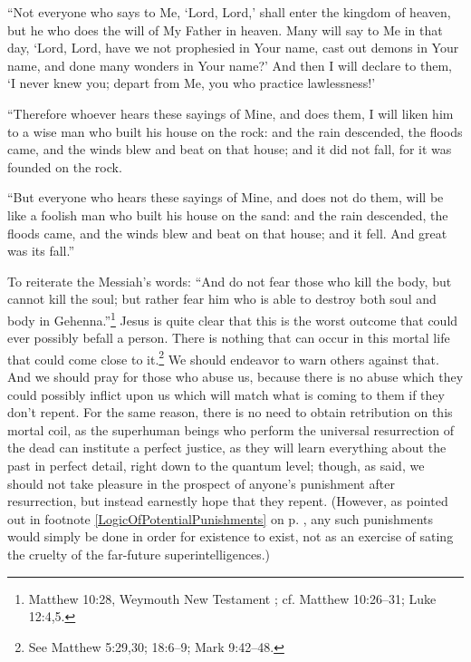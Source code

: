 \documentclass[letterpaper,12pt]{article}
\newenvironment{squotation}
  {\small\quotation}
  {\endquotation\normalsize}
\begin{document}
\begin{squotation}
``Not everyone who says to Me, `Lord, Lord,' shall enter the kingdom of heaven, but he who does the will of My Father in heaven. Many will say to Me in that day, `Lord, Lord, have we not prophesied in Your name, cast out demons in Your name, and done many wonders in Your name?' And then I will declare to them, `I never knew you; depart from Me, you who practice lawlessness!'

``Therefore whoever hears these sayings of Mine, and does them, I will liken him to a wise man who built his house on the rock: and the rain descended, the floods came, and the winds blew and beat on that house; and it did not fall, for it was founded on the rock.

``But everyone who hears these sayings of Mine, and does not do them, will be like a foolish man who built his house on the sand: and the rain descended, the floods came, and the winds blew and beat on that house; and it fell. And great was its fall.''
\end{squotation}

To reiterate the Messiah's words: ``And do not fear those who kill the body, but cannot kill the soul; but rather fear him who is able to destroy both soul and body in Gehenna.''\footnote{Matthew 10:28, Weymouth New Testament \cite{Weymouth1903}; cf. Matthew 10:26--31; Luke 12:4,5.} Jesus is quite clear that this is the worst outcome that could ever possibly befall a person. There is nothing that can occur in this mortal life that could come close to it.\footnote{See Matthew 5:29,30; 18:6--9; Mark 9:42--48.} We should endeavor to warn others against that. And we should pray for those who abuse us, because there is no abuse which they could possibly inflict upon us which will match what is coming to them if they don't repent. For the same reason, there is no need to obtain retribution on this mortal coil, as the superhuman beings who perform the universal resurrection of the dead can institute a perfect justice, as they will learn everything about the past in perfect detail, right down to the quantum level; though, as said, we should not take pleasure in the prospect of anyone's punishment after resurrection, but instead earnestly hope that they repent. (However, as pointed out in footnote \ref{LogicOfPotentialPunishments} on p. \pageref{LogicOfPotentialPunishments}, any such punishments would simply be done in order for existence to exist, not as an exercise of sating the cruelty of the far-future superintelligences.)
\end{document}
